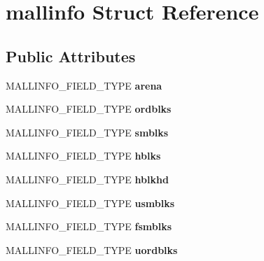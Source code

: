 \hypertarget{structmallinfo}{\section{mallinfo Struct Reference}
\label{structmallinfo}
}
\subsection*{Public Attributes}
\begin{DoxyCompactItemize}
\item 
\hypertarget{structmallinfo_a2dd8e574430e788f53919db129f2a2ff}{M\-A\-L\-L\-I\-N\-F\-O\-\_\-\-F\-I\-E\-L\-D\-\_\-\-T\-Y\-P\-E {\bfseries arena}}\label{structmallinfo_a2dd8e574430e788f53919db129f2a2ff}

\item 
\hypertarget{structmallinfo_afaac6d1e005097fa1ed835684e23bfa7}{M\-A\-L\-L\-I\-N\-F\-O\-\_\-\-F\-I\-E\-L\-D\-\_\-\-T\-Y\-P\-E {\bfseries ordblks}}\label{structmallinfo_afaac6d1e005097fa1ed835684e23bfa7}

\item 
\hypertarget{structmallinfo_a93076145f3f542dfe5e4e6d1e3feaf0b}{M\-A\-L\-L\-I\-N\-F\-O\-\_\-\-F\-I\-E\-L\-D\-\_\-\-T\-Y\-P\-E {\bfseries smblks}}\label{structmallinfo_a93076145f3f542dfe5e4e6d1e3feaf0b}

\item 
\hypertarget{structmallinfo_aaf01c52dcd016834ae176885fa32b550}{M\-A\-L\-L\-I\-N\-F\-O\-\_\-\-F\-I\-E\-L\-D\-\_\-\-T\-Y\-P\-E {\bfseries hblks}}\label{structmallinfo_aaf01c52dcd016834ae176885fa32b550}

\item 
\hypertarget{structmallinfo_ab78bcaeb59449f1a9c292bfe3dde8dbb}{M\-A\-L\-L\-I\-N\-F\-O\-\_\-\-F\-I\-E\-L\-D\-\_\-\-T\-Y\-P\-E {\bfseries hblkhd}}\label{structmallinfo_ab78bcaeb59449f1a9c292bfe3dde8dbb}

\item 
\hypertarget{structmallinfo_a470a5e18a1f5eb3cac48020268ca49b8}{M\-A\-L\-L\-I\-N\-F\-O\-\_\-\-F\-I\-E\-L\-D\-\_\-\-T\-Y\-P\-E {\bfseries usmblks}}\label{structmallinfo_a470a5e18a1f5eb3cac48020268ca49b8}

\item 
\hypertarget{structmallinfo_a6b1a33ff0fc95bdab9c79ce271f58003}{M\-A\-L\-L\-I\-N\-F\-O\-\_\-\-F\-I\-E\-L\-D\-\_\-\-T\-Y\-P\-E {\bfseries fsmblks}}\label{structmallinfo_a6b1a33ff0fc95bdab9c79ce271f58003}

\item 
\hypertarget{structmallinfo_a4676f74c10d8bf8b79585b04d520356f}{M\-A\-L\-L\-I\-N\-F\-O\-\_\-\-F\-I\-E\-L\-D\-\_\-\-T\-Y\-P\-E {\bfseries uordblks}}\label{structmallinfo_a4676f74c10d8bf8b79585b04d520356f}


\end{DoxyCompactItemize}

